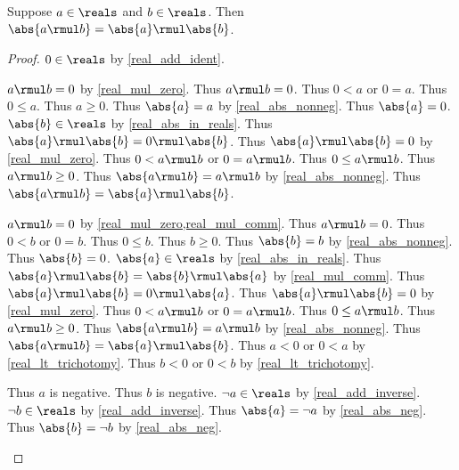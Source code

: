\begin{theorem}\label{real_abs_mul}
    Suppose $a\in\reals$ and $b\in\reals$.
    Then $\abs{a \rmul b} = \abs{a} \rmul \abs{b}$.
\end{theorem}
\begin{proof}
    $0\in\reals$ by \cref{real_add_ident}.
    \begin{byCase}
        $a \rmul b = 0$ by \cref{real_mul_zero}.
        Thus $a \rmul b = 0$.
        Thus $0 < a$ or $0 = a$.
        Thus $0 \leq a$.
        Thus $a \geq 0$.
        Thus $\abs{a} = a$ by \cref{real_abs_nonneg}.
        Thus $\abs{a} = 0$.
        $\abs{b}\in\reals$ by \cref{real_abs_in_reals}.
        Thus $\abs{a} \rmul \abs{b} = 0 \rmul \abs{b}$.
        Thus $\abs{a} \rmul \abs{b} = 0$ by \cref{real_mul_zero}.
        Thus $0 < a \rmul b$ or $0 = a \rmul b$.
        Thus $0 \leq a \rmul b$.
        Thus $a \rmul b \geq 0$.
        Thus $\abs{a \rmul b} = a \rmul b$ by \cref{real_abs_nonneg}.
        Thus $\abs{a \rmul b} = \abs{a} \rmul \abs{b}$.
        \begin{byCase}
            $a \rmul b = 0$ by \cref{real_mul_zero,real_mul_comm}.
            Thus $a \rmul b = 0$.
            Thus $0 < b$ or $0 = b$.
            Thus $0 \leq b$.
            Thus $b \geq 0$.
            Thus $\abs{b} = b$ by \cref{real_abs_nonneg}.
            Thus $\abs{b} = 0$.
            $\abs{a}\in\reals$ by \cref{real_abs_in_reals}.
            Thus $\abs{a} \rmul \abs{b} = \abs{b} \rmul \abs{a}$ by \cref{real_mul_comm}.
            Thus $\abs{a} \rmul \abs{b} = 0 \rmul \abs{a}$.
            Thus $\abs{a} \rmul \abs{b} = 0$ by \cref{real_mul_zero}.
            Thus $0 < a \rmul b$ or $0 = a \rmul b$.
            Thus $0 \leq a \rmul b$.
            Thus $a \rmul b \geq 0$.
            Thus $\abs{a \rmul b} = a \rmul b$ by \cref{real_abs_nonneg}.
            Thus $\abs{a \rmul b} = \abs{a} \rmul \abs{b}$.
            Thus $a < 0$ or $0 < a$ by \cref{real_lt_trichotomy}.
            Thus $b < 0$ or $0 < b$ by \cref{real_lt_trichotomy}.
            \begin{byCase}
                Thus $a$ is negative.
                Thus $b$ is negative.
                $\neg{a}\in\reals$ by \cref{real_add_inverse}.
                $\neg{b}\in\reals$ by \cref{real_add_inverse}.
                Thus $\abs{a} = \neg{a}$ by \cref{real_abs_neg}.
                Thus $\abs{b} = \neg{b}$ by \cref{real_abs_neg}.

\end{byCase}
\end{byCase}
\end{byCase}
\end{proof}
